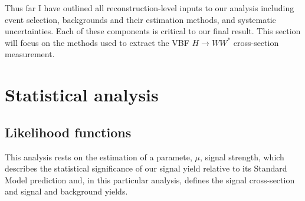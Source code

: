 Thus far I have outlined all reconstruction-level inputs to our analysis including event selection, backgrounds and their estimation methods, and systematic uncertainties. Each of these components is critical to our final result. This section will focus on the methods used to extract the VBF $H\rightarrow WW^*$ cross-section measurement. 
\section{Statistical analysis}
\subsection{Likelihood functions}
This analysis rests on the estimation of a paramete, $\mu$, signal strength, which describes the statistical significance of our signal yield relative to its Standard Model prediction and, in this particular analysis, defines the signal cross-section and signal and background yields. 

